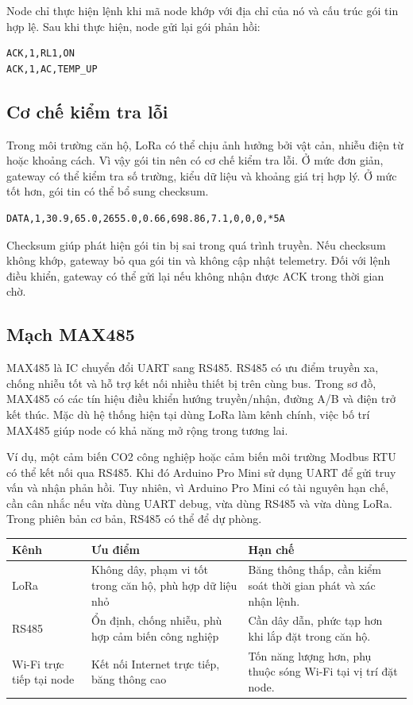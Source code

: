 Node chỉ thực hiện lệnh khi mã node khớp với địa chỉ của nó và cấu trúc gói tin hợp lệ. Sau khi thực hiện, node gửi lại gói phản hồi:

\begin{lstlisting}[caption={Gói phản hồi trạng thái từ node}]
ACK,1,RL1,ON
ACK,1,AC,TEMP_UP
\end{lstlisting}

\subsection{Cơ chế kiểm tra lỗi}
Trong môi trường căn hộ, LoRa có thể chịu ảnh hưởng bởi vật cản, nhiễu điện từ hoặc khoảng cách. Vì vậy gói tin nên có cơ chế kiểm tra lỗi. Ở mức đơn giản, gateway có thể kiểm tra số trường, kiểu dữ liệu và khoảng giá trị hợp lý. Ở mức tốt hơn, gói tin có thể bổ sung checksum.

\begin{lstlisting}[caption={Ví dụ gói tin có checksum}]
DATA,1,30.9,65.0,2655.0,0.66,698.86,7.1,0,0,0,*5A
\end{lstlisting}

Checksum giúp phát hiện gói tin bị sai trong quá trình truyền. Nếu checksum không khớp, gateway bỏ qua gói tin và không cập nhật telemetry. Đối với lệnh điều khiển, gateway có thể gửi lại nếu không nhận được ACK trong thời gian chờ.

\subsection{Mạch MAX485}
MAX485 là IC chuyển đổi UART sang RS485. RS485 có ưu điểm truyền xa, chống nhiễu tốt và hỗ trợ kết nối nhiều thiết bị trên cùng bus. Trong sơ đồ, MAX485 có các tín hiệu điều khiển hướng truyền/nhận, đường A/B và điện trở kết thúc. Mặc dù hệ thống hiện tại dùng LoRa làm kênh chính, việc bố trí MAX485 giúp node có khả năng mở rộng trong tương lai.

Ví dụ, một cảm biến CO2 công nghiệp hoặc cảm biến môi trường Modbus RTU có thể kết nối qua RS485. Khi đó Arduino Pro Mini sử dụng UART để gửi truy vấn và nhận phản hồi. Tuy nhiên, vì Arduino Pro Mini có tài nguyên hạn chế, cần cân nhắc nếu vừa dùng UART debug, vừa dùng RS485 và vừa dùng LoRa. Trong phiên bản cơ bản, RS485 có thể để dự phòng.

\begin{longtable}{|p{3.2cm}|p{4.5cm}|p{5.5cm}|}
\hline
\textbf{Kênh} & \textbf{Ưu điểm} & \textbf{Hạn chế} \\
\hline
LoRa & Không dây, phạm vi tốt trong căn hộ, phù hợp dữ liệu nhỏ & Băng thông thấp, cần kiểm soát thời gian phát và xác nhận lệnh. \\
\hline
RS485 & Ổn định, chống nhiễu, phù hợp cảm biến công nghiệp & Cần dây dẫn, phức tạp hơn khi lắp đặt trong căn hộ. \\
\hline
Wi-Fi trực tiếp tại node & Kết nối Internet trực tiếp, băng thông cao & Tốn năng lượng hơn, phụ thuộc sóng Wi-Fi tại vị trí đặt node. \\
\hline
\end{longtable}

